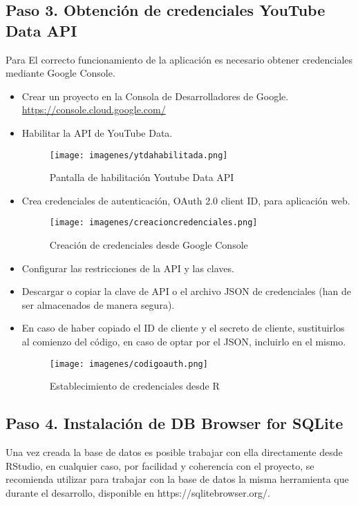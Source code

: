 \documentclass[a4paper,12pt,twoside]{memoir}
\begin{document}
\subsection{Paso 3. Obtención de credenciales YouTube Data API} Para El correcto funcionamiento de la aplicación es necesario obtener credenciales mediante Google Console.
\begin{itemize}
  \item Crear un proyecto en la Consola de Desarrolladores de Google. \url{https://console.cloud.google.com/}
  \item Habilitar la API de YouTube Data.
   \begin{figure}
    \centering
    \texttt{[image: imagenes/ytdahabilitada.png]}
    \caption{Pantalla de habilitación Youtube Data API}
    \label{fig:enter-label}
\end{figure}
  \item Crea credenciales de autenticación, OAuth 2.0 client ID, para aplicación web.
  \begin{figure}
    \centering
    \texttt{[image: imagenes/creacioncredenciales.png]}
    \caption{Creación de credenciales desde Google Console}
    \label{fig:enter-label}
\end{figure}
  \item Configurar las restricciones de la API y las claves.
  \item Descargar o copiar la clave de API o el archivo JSON de credenciales (han de ser almacenados de manera segura).
  \item En caso de haber copiado el ID de cliente y el secreto de cliente, sustituirlos al comienzo del código, en caso de optar por el JSON, incluirlo en el mismo.
  \begin{figure}
    \centering
    \texttt{[image: imagenes/codigoauth.png]}
    \caption{Establecimiento de credenciales desde R}
    \label{fig:enter-label}
\end{figure}
\end{itemize}
\subsection{Paso 4. Instalación de DB Browser for SQLite} Una vez creada la base de datos es posible trabajar con ella directamente desde RStudio, en cualquier caso, por facilidad y coherencia con el proyecto, se recomienda utilizar para trabajar con la base de datos la misma herramienta que durante el desarrollo, disponible en https://sqlitebrowser.org/.
\end{document}
